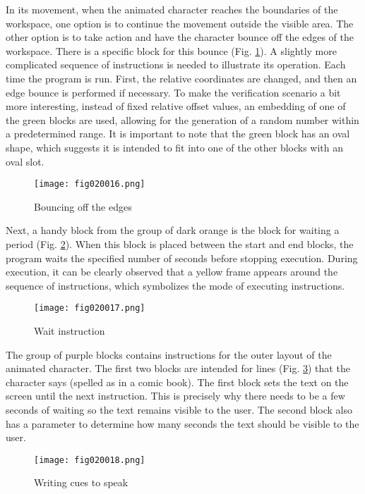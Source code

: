 In its movement, when the animated character reaches the boundaries of the workspace, one option is to continue the movement outside the visible area. The other option is to take action and have the character bounce off the edges of the workspace. There is a specific block for this bounce (Fig. \ref{fig020016}). A slightly more complicated sequence of instructions is needed to illustrate its operation. Each time the program is run. First, the relative coordinates are changed, and then an edge bounce is performed if necessary. To make the verification scenario a bit more interesting, instead of fixed relative offset values, an embedding of one of the green blocks are used, allowing for the generation of a random number within a predetermined range. It is important to note that the green block has an oval shape, which suggests it is intended to fit into one of the other blocks with an oval slot.

\begin{figure}[H]
   \centering
   \texttt{[image: fig020016.png]}
   \caption{Bouncing off the edges}
\label{fig020016}
\end{figure}

Next, a handy block from the group of dark orange is the block for waiting a period (Fig. \ref{fig020017}). When this block is placed between the start and end blocks, the program waits the specified number of seconds before stopping execution. During execution, it can be clearly observed that a yellow frame appears around the sequence of instructions, which symbolizes the mode of executing instructions.

\begin{figure}[H]
   \centering
   \texttt{[image: fig020017.png]}
   \caption{Wait instruction}
\label{fig020017}
\end{figure}

The group of purple blocks contains instructions for the outer layout of the animated character. The first two blocks are intended for lines (Fig. \ref{fig020018}) that the character says (spelled as in a comic book). The first block sets the text on the screen until the next instruction. This is precisely why there needs to be a few seconds of waiting so the text remains visible to the user. The second block also has a parameter to determine how many seconds the text should be visible to the user.

\begin{figure}[H]
   \centering
   \texttt{[image: fig020018.png]}
   \caption{Writing cues to speak}
\label{fig020018}
\end{figure}

